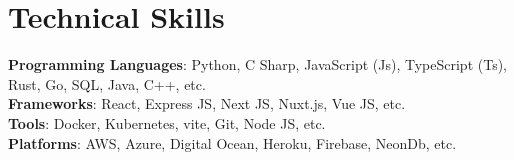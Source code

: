 \section{Technical Skills}
\begin{itemize}[leftmargin=0.15in, label={}]
    \small{\item{
                                        \textbf{Programming Languages}{: Python,                          C Sharp,                          JavaScript (Js),                          TypeScript (Ts),                          Rust,                          Go,                          SQL,                          Java,                          C++,  etc.                        }\\                                        \textbf{Frameworks}{: React,                          Express JS,                          Next JS,                          Nuxt.js,                          Vue JS,  etc.                        }\\                                        \textbf{Tools}{: Docker,                          Kubernetes,                          vite,                          Git,                          Node JS,  etc.                        }\\                                        \textbf{Platforms}{: AWS,                          Azure,                          Digital Ocean,                          Heroku,                          Firebase,                          NeonDb,  etc.                        }                                  }}
\end{itemize}
